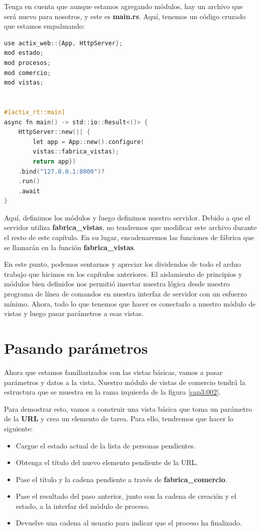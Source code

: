 Tenga en cuenta que aunque estamos agregando módulos, hay un archivo que será nuevo para nosotros, y este es \textbf{main.rs}. Aquí, tenemos un código cruzado que estamos empalmando:

\begin{lstlisting}[language=C]
use actix_web::{App, HttpServer};
mod estado;
mod procesos;
mod comercio;
mod vistas;


#[actix_rt::main]
async fn main() -> std::io::Result<()> {
	HttpServer::new(|| {
		let app = App::new().configure(
		vistas::fabrica_vistas);
		return app})
	.bind("127.0.0.1:8000")?
	.run()
	.await	
}
\end{lstlisting}

Aquí, definimos los módulos y luego definimos nuestro servidor. Debido a que el servidor utiliza \textbf{fabrica\_vistas}, no tendremos que modificar este archivo durante el resto de este capítulo. En su lugar, encadenaremos las funciones de fábrica que se llamarán en la función \textbf{fabrica\_vistas}.

En este punto, podemos sentarnos y apreciar los dividendos de todo el arduo trabajo que hicimos en los capítulos anteriores. El aislamiento de principios y módulos bien definidos nos permitió insertar nuestra lógica desde nuestro programa de línea de comandos en nuestra interfaz de servidor con un esfuerzo mínimo. Ahora, todo lo que tenemos que hacer es conectarlo a nuestro módulo de vistas y luego pasar parámetros a esas vistas.

\section{Pasando parámetros}

Ahora que estamos familiarizados con las vistas básicas, vamos a pasar parámetros y datos a la vista. Nuestro módulo de vistas de comercio tendrá la estructura que se muestra en la rama izquierda de la figura \ref{cap3:002}.

Para demostrar esto, vamos a construir una vista básica que toma un parámetro de la \textbf{URL} y crea un elemento de tarea. Para ello, tendremos que hacer lo siguiente:

\begin{itemize}
	\item Cargue el estado actual de la lista de personas pendientes.
	\item Obtenga el título del nuevo elemento pendiente de la URL.
	\item Pase el título y la cadena pendiente a través de \textbf{fabrica\_comercio}.
	\item Pase el resultado del paso anterior, junto con la cadena de creación y el estado, a la interfaz del módulo de proceso.
	\item Devuelve una cadena al usuario para indicar que el proceso ha finalizado.
\end{itemize}


